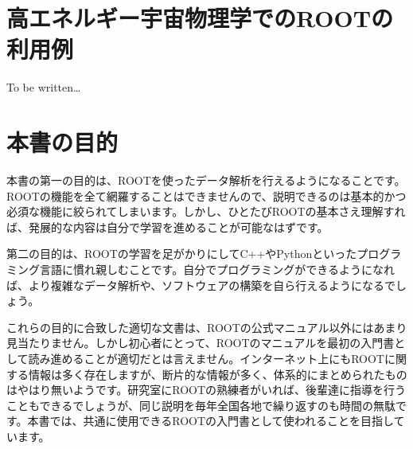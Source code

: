 \section{高エネルギー宇宙物理学でのROOTの利用例}
To be written\ldots


\section{本書の目的}

本書の第一の目的は、ROOTを使ったデータ解析を行えるようになることです。ROOTの機能を全て網羅することはできませんので、説明できるのは基本的かつ必須な機能に絞られてしまいます。しかし、ひとたびROOTの基本さえ理解すれば、発展的な内容は自分で学習を進めることが可能なはずです。

第二の目的は、ROOTの学習を足がかりにしてC++やPythonといったプログラミング言語に慣れ親しむことです。自分でプログラミングができるようになれば、より複雑なデータ解析や、ソフトウェアの構築を自ら行えるようになるでしょう。

これらの目的に合致した適切な文書は、ROOTの公式マニュアル以外にはあまり見当たりません。しかし初心者にとって、ROOTのマニュアルを最初の入門書として読み進めることが適切だとは言えません。インターネット上にもROOTに関する情報は多く存在しますが、断片的な情報が多く、体系的にまとめられたものはやはり無いようです。研究室にROOTの熟練者がいれば、後輩達に指導を行うこともできるでしょうが、同じ説明を毎年全国各地で繰り返すのも時間の無駄です。本書では、共通に使用できるROOTの入門書として使われることを目指しています。


